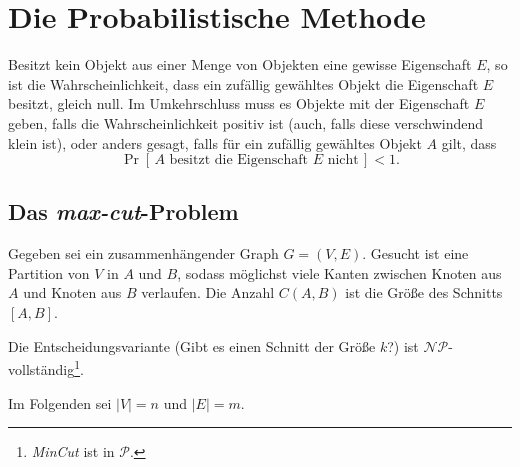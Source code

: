 \section{Die Probabilistische Methode}
Besitzt kein Objekt aus einer Menge von Objekten eine gewisse Eigenschaft $E$,
so ist die Wahrscheinlichkeit, dass ein zufällig gewähltes Objekt die
Eigenschaft $E$ besitzt, gleich null. Im Umkehrschluss muss es Objekte mit der
Eigenschaft $E$ geben, falls die Wahrscheinlichkeit positiv ist (auch, falls
diese verschwindend klein ist), oder anders gesagt, falls für ein zufällig
gewähltes Objekt $A$ gilt, dass
\[
  \Pr\left[\,A \text{ besitzt die Eigenschaft } E \text{ nicht}\,\right] < 1.
\]
\subsection{Das \emph{max-cut}-Problem}
Gegeben sei ein zusammenhängender Graph $G=\left(V, E\right)$. Gesucht ist eine
Partition von $V$ in $A$ und $B$, sodass möglichst viele Kanten zwischen Knoten
aus $A$ und Knoten aus $B$ verlaufen. Die Anzahl $C\left(A,B\right)$ ist die
Größe des Schnitts $\left[A,B\right]$.

Die Entscheidungsvariante (\glqq Gibt es einen Schnitt der Größe $k$?\grqq) ist
$\mathcal{NP}$-vollständig\footnote{\emph{MinCut} ist in $\mathcal{P}$.}.

Im Folgenden sei $|V| = n$ und $|E| = m$.

